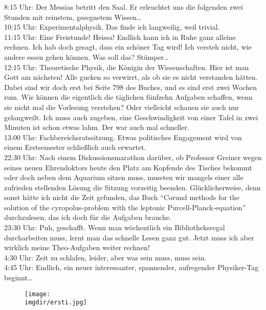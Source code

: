 8:15 Uhr: Der Messias betritt den Saal. Er erleuchtet uns die
folgenden zwei Stunden mit reinstem, gesegnetem Wissen\ldots\\
10:15 Uhr: Experimentalphysik. Das finde ich langweilig, weil
trivial.\\
11:15 Uhr: Eine Freistunde! Heissa! Endlich kann ich in Ruhe ganz alleine rechnen. Ich hab doch gesagt, dass ein schöner Tag wird! Ich versteh nicht, wie andere essen gehen können. Was soll das? Stümper\ldots\\
12:15 Uhr: Theoretische Physik, die Königin der Wissenschaften. Hier ist man Gott am nächsten! Alle gucken so verwirrt, als ob sie es nicht verstanden hätten. Dabei sind wir doch erst bei Seite 798 des Buches, und es sind erst zwei Wochen rum. Wie können die eigentlich die täglichen fünfzehn Aufgaben schaffen, wenn sie nicht mal die Vorlesung verstehen? Oder vielleicht schauen sie auch nur gelangweilt. Ich muss auch zugeben, eine Geschwindigkeit von einer Tafel in zwei Minuten ist schon etwas lahm. Der war auch mal schneller.\\
13:00 Uhr: Fachbereichsratssitzung. Etwas politisches Engagement wird von einem Erstsemester schlie\ss lich auch erwartet.\\
22:30 Uhr: Nach einem Diskussionsmarathon darüber, ob Professor Greiner wegen seines neuen Ehrendoktors heute den Platz am Kopfende des Tisches bekommt oder doch neben dem Aquarium sitzen muss, mussten wir mangels einer alle zufrieden stellenden Lösung die Sitzung vorzeitig beenden. Glücklicherweise, denn sonst hätte ich nicht die Zeit gefunden, das Buch \enquote{Corund methods for the solution of the cyropolus-problem with the leptonic Purcell-Planck-equation} durchzulesen, das ich doch für die Aufgaben brauche.\\
23:30 Uhr: Puh, geschafft. Wenn man wöchentlich ein Bibliotheksregal durcharbeiten muss, lernt man das schnelle Lesen ganz gut. Jetzt muss ich aber wirklich meine Theo-Aufgaben weiter rechnen!\\
4:30 Uhr: Zeit zu schlafen, leider, aber was sein muss, muss sein.\\
4:45 Uhr: Endlich, ein neuer interessanter, spannender, aufregender Physiker-Tag beginnt\ldots
\begin{figure}[!b]
 	\centering
  	\texttt{[image: \\imgdir/ersti.jpg]}
\end{figure}
